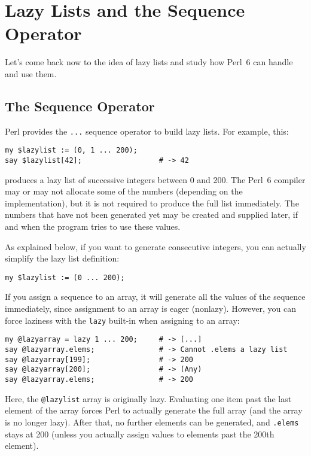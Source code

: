 \section{Lazy Lists and the Sequence Operator}

Let's come back now to the idea of lazy lists and study 
how Perl~6 can handle and use them.

\subsection{The Sequence Operator}

Perl provides the \verb'...' sequence operator to build 
lazy lists. For example, this:

\begin{verbatim}
my $lazylist := (0, 1 ... 200);
say $lazylist[42];                  # -> 42
\end{verbatim}

produces a lazy list of successive integers between 0 and 200. 
The Perl~6 compiler may or may not allocate some of the numbers
(depending on the implementation), but it is not required to 
produce the full list immediately. The numbers that have not 
been generated yet may be created and supplied later, if and when 
the program tries to use these values. 

As explained below, if you want to generate consecutive 
integers, you can actually simplify the lazy list definition:

\begin{verbatim}
my $lazylist := (0 ... 200);
\end{verbatim}


If you assign a sequence to an array, it will generate 
all the values of the sequence immediately, since 
assignment to an array is eager (nonlazy).  However, 
you can force laziness with the  {\tt lazy} built-in 
when assigning to an array:

\begin{verbatim}
my @lazyarray = lazy 1 ... 200;     # -> [...]
say @lazyarray.elems;               # -> Cannot .elems a lazy list
say @lazyarray[199];                # -> 200
say @lazyarray[200];                # -> (Any)
say @lazyarray.elems;               # -> 200
\end{verbatim}

Here, the \verb'@lazylist' array is originally lazy. 
Evaluating one item past the last element of the array 
forces Perl to actually generate the full array (and the 
array is no longer lazy). After that, no further elements 
can be generated, and {\tt .elems} stays at 200 (unless 
you actually assign values to elements past the 200th 
element).

